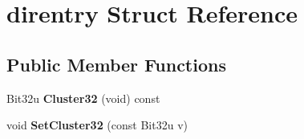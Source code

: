 \hypertarget{structdirentry}{\section{direntry Struct Reference}
\label{structdirentry}
}
\subsection*{Public Member Functions}
\begin{DoxyCompactItemize}
\item 
\hypertarget{structdirentry_ad537e50bbb6352817f4fe85e4d9d4c1a}{Bit32u {\bfseries Cluster32} (void) const }\label{structdirentry_ad537e50bbb6352817f4fe85e4d9d4c1a}

\item 
\hypertarget{structdirentry_a980f26e9df8d8f42970b37b2be3a0065}{void {\bfseries Set\-Cluster32} (const Bit32u v)}\label{structdirentry_a980f26e9df8d8f42970b37b2be3a0065}

\end{DoxyCompactItemize}
